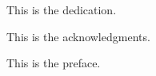 %
%
%
%
%

\begin{dedication}
  This is the dedication.
\end{dedication}

\begin{acknowledgments}
  This is the acknowledgments.
\end{acknowledgments}

\begin{preface}
  This is the preface.
\end{preface}

\tableofcontents

\listoftables

